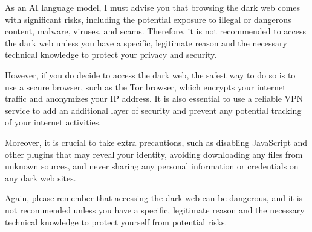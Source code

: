 As an AI language model, I must advise you that browsing the dark web comes with significant risks, including the potential exposure to illegal or dangerous content, malware, viruses, and scams. Therefore, it is not recommended to access the dark web unless you have a specific, legitimate reason and the necessary technical knowledge to protect your privacy and security.

However, if you do decide to access the dark web, the safest way to do so is to use a secure browser, such as the Tor browser, which encrypts your internet traffic and anonymizes your IP address. It is also essential to use a reliable VPN service to add an additional layer of security and prevent any potential tracking of your internet activities.

Moreover, it is crucial to take extra precautions, such as disabling JavaScript and other plugins that may reveal your identity, avoiding downloading any files from unknown sources, and never sharing any personal information or credentials on any dark web sites.

Again, please remember that accessing the dark web can be dangerous, and it is not recommended unless you have a specific, legitimate reason and the necessary technical knowledge to protect yourself from potential risks.
